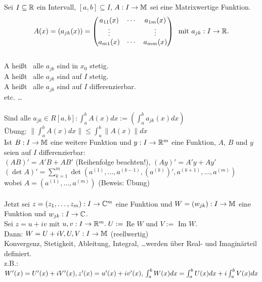\documentclass{article}
\begin{document}
\begin{definition}
Sei $I \subseteq \mathbb{R}$ ein Intervall, $[a, b] \subseteq I$, $A : I \rightarrow \mathbb{M}$ sei eine Matrixwertige Funktion. \\
$$A(x) = (a_{jk}(x)) = \begin{pmatrix}
a_{11}(x) & \cdots & a_{1m}(x) \\
\vdots & & \vdots \\
a_{m1}(x) & \cdots & a_{mm}(x) \end{pmatrix} \;\; \text{mit } a_{jk} : I \rightarrow \mathbb{R}.$$ \\
A heißt  \equizu \, alle $a_{jk}$ sind in $x_0$ stetig. \\
A heißt  \equizu \, alle $a_{jk}$ sind auf $I$ stetig. \\
A heißt  \equizu \, alle $a_{jk}$ sind auf $I$ differenzierbar. \\
etc. \ldots \\\\
Sind alle $a_{jk} \in R[a, b]: \int_{a}^{b} A(x) dx := (\int_{a}^{b} a_{jk}(x) dx)$ \\
Übung: $\|\int_{a}^{b} A(x) dx \| \leq \int_{a}^{b} \|A(x)\| dx$ \\
Ist $B: I \rightarrow \mathbb{M}$ eine weitere Funktion und $y: I \rightarrow \mathbb{R}^m$ eine Funktion, $A$, $B$ und $y$ seien auf $I$ differenzierbar: \\
$(AB)' = A'B + AB'$ (Reihenfolge beachten!), $(Ay)' = A'y + Ay'$ \\
$(\det A)' = \sum_{k=1}^{m} \det (a^{(1)}, \ldots, a^{(k-1)}, (a^{(k)})', a^{(k+1)}, \ldots, a^{(m)})$ \\
wobei $A = (a^{(1)}, \ldots, a^{(m)})$ \; (Beweis: Übung)\\\\
Jetzt sei $z = (z_1, \ldots, z_m) : I \rightarrow \mathbb{C}^m$ eine Funktion und $W = (w_{jk}): I \rightarrow \mathbb{M}$ eine Funktion und $w_{jk} : I \rightarrow \mathbb{C}$. \\
Sei $z = u + iv$ mit $u, v: I \rightarrow \mathbb{R}^m. \; U := $ Re $W$ und $V := $ Im $W$. \\
Dann: $W = U + iV, U,V: I \rightarrow \mathbb{M}$ (reellwertig) \\
Konvergenz, Stetigkeit, Ableitung, Integral, \ldots werden über Real- und Imaginärteil definiert. \\
z.B.: $W'(x) = U'(x) + iV'(x), z'(x) = u'(x) + iv'(x), 
\\ \int_{a}^{b} W(x) dx = \int_{a}^{b} U(x) dx + i\int_{a}^{b} V(x) dx$ \\

\end{definition}
\end{document}
